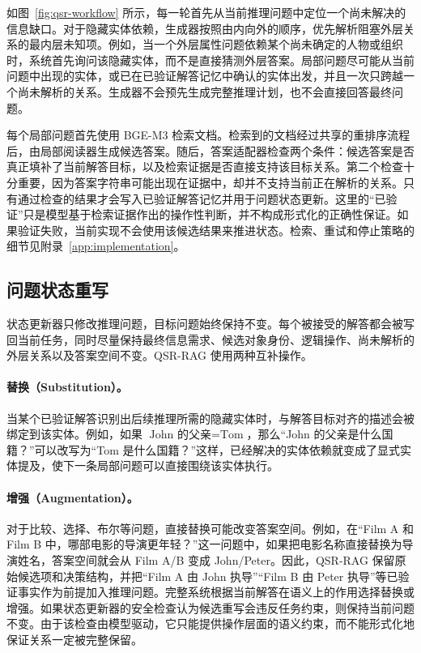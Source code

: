 \documentclass[11pt]{article}
\begin{document}
	如图~\ref{fig:qsr-workflow} 所示，每一轮首先从当前推理问题中定位一个尚未解决的信息缺口。对于隐藏实体依赖，生成器按照由内向外的顺序，优先解析阻塞外层关系的最内层未知项。例如，当一个外层属性问题依赖某个尚未确定的人物或组织时，系统首先询问该隐藏实体，而不是直接猜测外层答案。局部问题尽可能从当前问题中出现的实体，或已在已验证解答记忆中确认的实体出发，并且一次只跨越一个尚未解析的关系。生成器不会预先生成完整推理计划，也不会直接回答最终问题。

	每个局部问题首先使用 BGE-M3 检索文档。检索到的文档经过共享的重排序流程后，由局部阅读器生成候选答案。随后，答案适配器检查两个条件：候选答案是否真正填补了当前解答目标，以及检索证据是否直接支持该目标关系。第二个检查十分重要，因为答案字符串可能出现在证据中，却并不支持当前正在解析的关系。只有通过检查的结果才会写入已验证解答记忆并用于问题状态更新。这里的“已验证”只是模型基于检索证据作出的操作性判断，并不构成形式化的正确性保证。如果验证失败，当前实现不会使用该候选结果来推进状态。检索、重试和停止策略的细节见附录~\ref{app:implementation}。

	\subsection{问题状态重写}
	状态更新器只修改推理问题，目标问题始终保持不变。每个被接受的解答都会被写回当前任务，同时尽量保持最终信息需求、候选对象身份、逻辑操作、尚未解析的外层关系以及答案空间不变。QSR-RAG 使用两种互补操作。

	\paragraph{替换（Substitution）。}
	当某个已验证解答识别出后续推理所需的隐藏实体时，与解答目标对齐的描述会被绑定到该实体。例如，如果 $\text{John 的父亲}=\text{Tom}$，那么“John 的父亲是什么国籍？”可以改写为“Tom 是什么国籍？”这样，已经解决的实体依赖就变成了显式实体提及，使下一条局部问题可以直接围绕该实体执行。

	\paragraph{增强（Augmentation）。}
	对于比较、选择、布尔等问题，直接替换可能改变答案空间。例如，在“Film A 和 Film B 中，哪部电影的导演更年轻？”这一问题中，如果把电影名称直接替换为导演姓名，答案空间就会从 Film A/B 变成 John/Peter。因此，QSR-RAG 保留原始候选项和决策结构，并把“Film A 由 John 执导”“Film B 由 Peter 执导”等已验证事实作为前提加入推理问题。完整系统根据当前解答在语义上的作用选择替换或增强。如果状态更新器的安全检查认为候选重写会违反任务约束，则保持当前问题不变。由于该检查由模型驱动，它只能提供操作层面的语义约束，而不能形式化地保证关系一定被完整保留。
\end{document}
